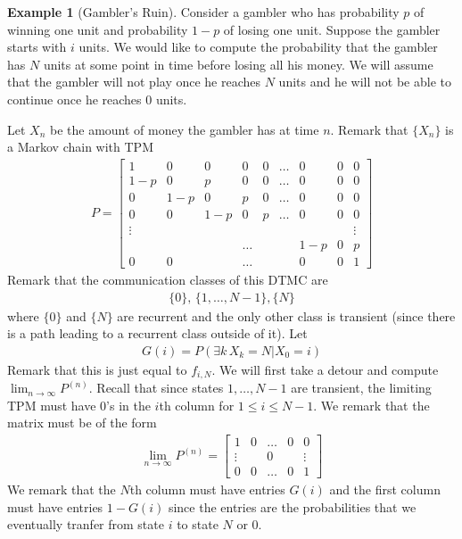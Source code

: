 \documentclass[11pt]{amsart}
\theoremstyle{definition}
\newtheorem{example}[theorem]{Example}
\numberwithin{equation}{section}
\begin{document}
 \begin{example}[Gambler's Ruin]
     Consider a gambler who has probability $p$ of winning one unit and probability $1-p$ of losing one unit. Suppose the gambler starts with $i$ units. We would like to compute the probability that the gambler has $N$ units at some point in time before losing all his money. We will assume that the gambler will not play once he reaches $N$ units and he will not be able to continue once he reaches 0 units.

     Let $X_n$ be the amount of money the gambler has at time $n$. Remark that $\{X_n\}$ is a Markov chain with TPM
     \begin{align*}
         P=\begin{bmatrix}
             1 & 0 & 0 & 0 & 0 & \ldots & 0 & 0 & 0\\
             1-p & 0 & p & 0 & 0 & \ldots & 0 &  0 & 0\\
             0 & 1-p & 0 & p & 0 & \ldots & 0 &  0 & 0\\
             0 & 0 & 1-p & 0 & p & \ldots & 0 & 0 & 0\\
             \vdots & & & & & & & &  \vdots\\
             & & & \ldots & & & 1-p & 0 & p\\
             0 & 0 & & \ldots & & & 0 & 0 &1
         \end{bmatrix}
     \end{align*}
     Remark that the communication classes of this DTMC are
     \begin{align*}
         \{0\},\,\{1,\ldots,N-1\},\{N\}
     \end{align*}
     where $\{0\}$ and $\{N\}$ are recurrent and the only other class is transient (since there is a path leading to a recurrent class outside of it). Let
     \begin{align*}
         G(i)=P(\exists k\,X_k=N|X_0=i)
     \end{align*}
     Remark that this is just equal to $f_{i,N}$. We will first take a detour and compute $\lim_{n\to\infty}P^{(n)}$. Recall that since states $1,\ldots,N-1$ are transient, the limiting TPM must have 0's in the $i$th column for $1\le i\le N-1$. We remark that the matrix must be of the form
     \begin{align*}
         \lim_{n\to\infty}P^{(n)}=\begin{bmatrix}
             1 & 0 & \ldots & 0 & 0\\
             \vdots & & 0 & & \vdots\\
             0 & 0 & \ldots & 0 & 1
         \end{bmatrix} 
     \end{align*}
     We remark that the $N$th column must have entries $G(i)$ and the first column must have entries $1-G(i)$ since the entries are the probabilities that we eventually tranfer from state $i$ to state $N$ or 0.


\end{example}
\end{document}
